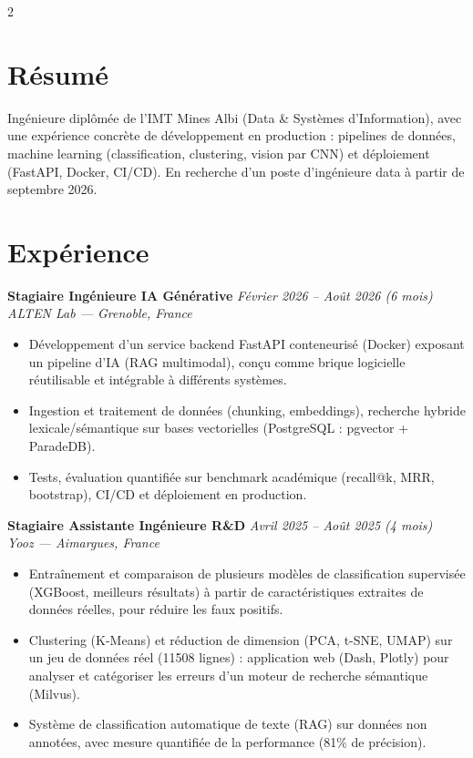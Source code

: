 \documentclass[10.5pt,a4paper]{article}
\newcommand{\sectionrule}{\vspace{-6pt}{\color{accent}\hrule height 1pt}\vspace{2pt}}
\newcommand{\cvexp}[5]{%
  \noindent\textbf{#1} \hfill {\itshape\color{graytext}\small #4}\\
  {\itshape #2 --- #3}\\[-2pt]
  #5
  \vspace{5pt}
}
\begin{document}
\setlength{\columnsep}{1.5em}
\begin{paracol}{2}

\section*{Résumé}
\sectionrule
\justifying
Ingénieure diplômée de l'IMT Mines Albi (Data \& Systèmes d'Information), avec une expérience concrète de développement en production : pipelines de données, machine learning (classification, clustering, vision par CNN) et déploiement (FastAPI, Docker, CI/CD). En recherche d'un poste d'ingénieure data à partir de septembre 2026.

\section*{Expérience}
\sectionrule

\cvexp{Stagiaire Ingénieure IA Générative}{ALTEN Lab}{Grenoble, France}{Février 2026 -- Août 2026 (6 mois)}{%
  \begin{itemize}[leftmargin=12pt, itemsep=2pt, topsep=0pt, partopsep=0pt, parsep=0pt]
    \item Développement d'un service backend FastAPI conteneurisé (Docker) exposant un pipeline d'IA (RAG multimodal), conçu comme brique logicielle réutilisable et intégrable à différents systèmes.
    \item Ingestion et traitement de données (chunking, embeddings), recherche hybride lexicale/sémantique sur bases vectorielles (PostgreSQL : pgvector + ParadeDB).
    \item Tests, évaluation quantifiée sur benchmark académique (recall@k, MRR, bootstrap), CI/CD et déploiement en production.
  \end{itemize}
}

\cvexp{Stagiaire Assistante Ingénieure R\&D}{Yooz}{Aimargues, France}{Avril 2025 -- Août 2025 (4 mois)}{%
  \begin{itemize}[leftmargin=12pt, itemsep=2pt, topsep=0pt, partopsep=0pt, parsep=0pt]
    \item Entraînement et comparaison de plusieurs modèles de classification supervisée (XGBoost, meilleurs résultats) à partir de caractéristiques extraites de données réelles, pour réduire les faux positifs.
    \item Clustering (K-Means) et réduction de dimension (PCA, t-SNE, UMAP) sur un jeu de données réel (11508 lignes) : application web (Dash, Plotly) pour analyser et catégoriser les erreurs d'un moteur de recherche sémantique (Milvus).
    \item Système de classification automatique de texte (RAG) sur données non annotées, avec mesure quantifiée de la performance (81\% de précision).
  \end{itemize}
}


\end{paracol}
\end{document}
